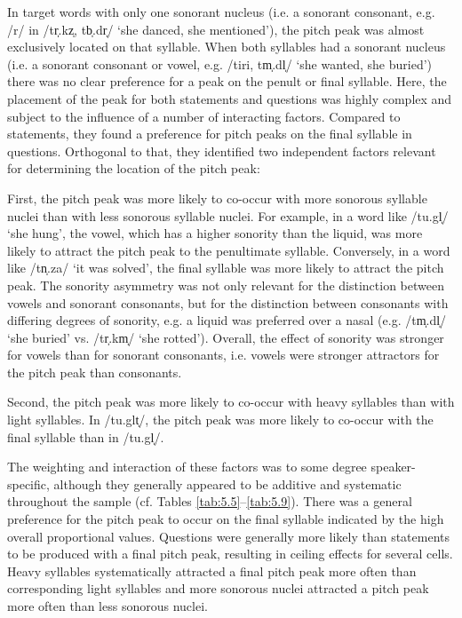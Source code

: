 In target words with only one sonorant nucleus (i.e. a sonorant consonant, e.g. /r/ in /tr̩.kz̩, tb̩.dr̩/ ‘she danced, she mentioned’), the pitch peak was almost exclusively located on that syllable. When both syllables had a sonorant nucleus (i.e. a sonorant consonant or vowel, e.g. /tiri, tm̩.dl̩/ ‘she wanted, she buried’) there was no clear preference for a peak on the penult or final syllable. Here, the placement of the peak for both statements and questions was highly complex and subject to the influence of a number of interacting factors. Compared to statements, they found a preference for pitch peaks on the final syllable in questions. Orthogonal to that, they identified two independent factors relevant for determining the location of the pitch peak: 

First, the pitch peak was more likely to co-occur with more sonorous syllable nuclei than with less sonorous syllable nuclei. For example, in a word like /tu.gl̩/ ‘she hung’, the vowel, which has a higher sonority than the liquid, was more likely to attract the pitch peak to the penultimate syllable. Conversely, in a word like /tn̩.za/ ‘it was solved’, the final syllable was more likely to attract the pitch peak. The sonority asymmetry was not only relevant for the distinction between vowels and sonorant consonants, but for the distinction between consonants with differing degrees of sonority, e.g. a liquid was preferred over a nasal (e.g. /tm̩.dl̩/ ‘she buried’ vs. /tr̩.km̩/ ‘she rotted’). Overall, the effect of sonority was stronger for vowels than for sonorant consonants, i.e. vowels were stronger attractors for the pitch peak than consonants.

Second, the pitch peak was more likely to co-occur with heavy syllables than with light syllables. In /tu.glt̩/, the pitch peak was more likely to co-occur with the final syllable than in /tu.gl̩/.

The weighting and interaction of these factors was to some degree speaker-specific, although they generally appeared to be additive and systematic throughout the sample (cf. Tables \ref{tab:5.5}--\ref{tab:5.9}). There was a general preference for the pitch peak to occur on the final syllable indicated by the high overall proportional values. Questions were generally more likely than statements to be produced with a final pitch peak, resulting in ceiling effects for several cells. Heavy syllables systematically attracted a final pitch peak more often than corresponding light syllables and more sonorous nuclei attracted a pitch peak more often than less sonorous nuclei. 

